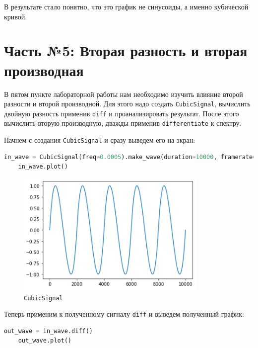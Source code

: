 \documentclass[a4paper]{article}
\begin{document}
            В результате стало понятно, что это график не синусоиды, а именно кубической кривой.
            
    \newpage
        \section{Часть №5: Вторая разность и вторая производная}
            В пятом пункте лабораторной работы нам необходимо изучить влияние второй разности и второй производной. Для этого надо создать \texttt{CubicSignal}, вычислить двойную разность применив \texttt{diff} и проанализировать результат. После этого вычислить вторую производную, дважды применив \texttt{differentiate} к спектру. 
            
            Начнем с создания \texttt{CubicSignal} и сразу выведем его на экран:
            
\begin{lstlisting}[language=Python, caption= Создание и вывод \texttt{CubicSignal}]
    in_wave = CubicSignal(freq=0.0005).make_wave(duration=10000, framerate=1)
    in_wave.plot()
\end{lstlisting}
            
            \begin{figure}[H]
                \centering
                \includegraphics{ex_5_1.png}
                \caption{\texttt{CubicSignal}}
                \label{fig:ex_5_1}
            \end{figure}
            
            Теперь применим к полученному сигналу \texttt{diff} и выведем полученный график:
            
\begin{lstlisting}[language=Python, caption= Применение \texttt{diff}]
    out_wave = in_wave.diff()
    out_wave.plot()
\end{lstlisting}
            
\end{document}

